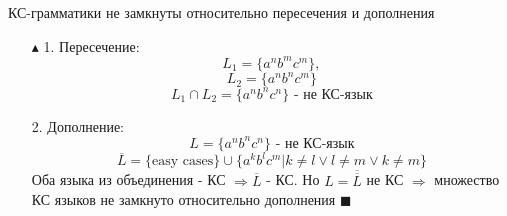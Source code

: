 \par \Statement КС-грамматики не замкнуты относительно пересечения и дополнения
\par \begin{itemize}
    \item[$\blacktriangle$ 1.] Пересечение: $$L_1=\{a^n b^m c^m\},$$ $$L_2=\{a^n b^n c^m\}$$ $$L_1 \cap L_2 = \{a^n b^n c^n \} \text{ - не КС-язык}$$
    \item[2.] Дополнение: $$L=\{a^nb^nc^n\} \text{ - не КС-язык}$$ $$\overline{L} = \{\text{easy cases}\} \cup \{a^k b^l c^m | k \neq l \vee l \neq m \vee k \neq m\}$$
    Оба языка из объединения - КС $\Rightarrow \overline{L}$ - КС. Но $L=\overline{\overline{L}}$ не КС $\Rightarrow$ множество КС языков не замкнуто относительно дополнения $\blacksquare$
\end{itemize}